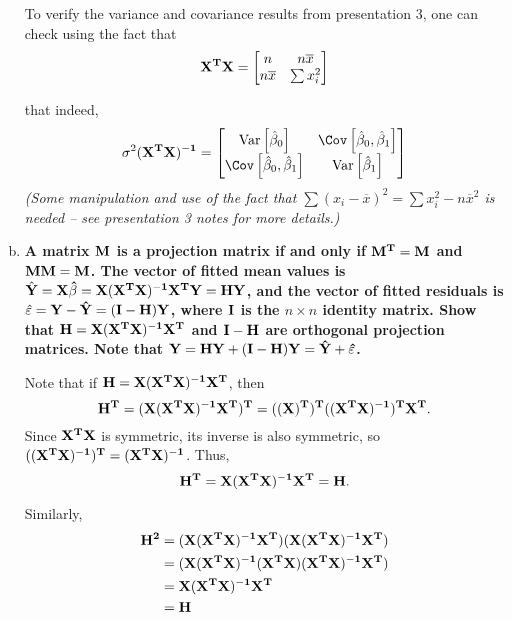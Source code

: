 \begin{enumerate}[a)]
To verify the variance and covariance results from presentation $3$, one can check using the fact that
\[
    \bf{X}^T \bf{X} = \begin{bmatrix}
        n & n \overline{x}   \\
        n \overline{x}  & \sum x_i^2
    \end{bmatrix}
\]

that indeed, 
\[
    \sigma^2 (\bf{X}^T \bf{X})^{-1} = \begin{bmatrix}
        \mathrm{Var} \left[\hat{\beta}_0 \right]  & \Cov \left[\hat{\beta}_0, \hat{\beta}_1 \right]   \\
        \Cov \left[\hat{\beta}_0, \hat{\beta}_1 \right] &  \mathrm{Var} \left[\hat{\beta}_1 \right] \\
    \end{bmatrix}
\]
\textit{(Some manipulation and use of the fact that $\sum (x_i - \overline{x} )^2 = \sum x_i^2 - n \overline{x}^2$ is needed -- see presentation 3 notes for more details.)}

\item \textbf{A matrix $\bf{M}$ is a projection matrix if and only if $\bf{M}^T = \bf{M}$ and $\bf{MM} = \bf{M}$. 
The vector of fitted mean values is $\hat{\bf{Y}} = \bf{X}\hat{\bf{\beta}} = \bf{X}(\bf{X}^T \bf{X})^{-1} \bf{X}^T \bf{Y} = \bf{HY}$, 
and the vector of fitted residuals is $\hat{\bf{\varepsilon}} = \bf{Y} - \hat{\bf{Y}} = (\bf{I} - \bf{H})\bf{Y}$, where $\bf{I}$ is the $n \times n$ identity matrix. 
Show that $\bf{H} = \bf{X}(\bf{X}^T \bf{X})^{-1} \bf{X}^T$ and $\bf{I} - \bf{H}$ are orthogonal projection matrices. 
Note that $\bf{Y} = \bf{HY} + (\bf{I} - \bf{H})\bf{Y} = \hat{\bf{Y}} + \hat{\bf{\varepsilon}}$.
}

Note that if $\bf{H} = \bf{X}(\bf{X}^T \bf{X})^{-1} \bf{X}^T$, then 
\[
    \bf{H}^T = (\bf{X}(\bf{X}^T \bf{X})^{-1} \bf{X}^T)^T = ((\bf{X})^T)^T ((\bf{X}^T \bf{X})^{-1})^T \bf{X}^T.
\]
Since $\bf{X}^T\bf{X}$ is symmetric, its inverse is also symmetric, so $((\bf{X}^T \bf{X})^{-1})^T = (\bf{X}^T \bf{X})^{-1}$. Thus,
\[
    \bf{H}^T = \bf{X} (\bf{X}^T \bf{X})^{-1} \bf{X}^T = \bf{H}.
\]

Similarly, 
\begin{align*}
    \bf{H}^2 &= (\bf{X}(\bf{X}^T \bf{X})^{-1} \bf{X}^T)(\bf{X}(\bf{X}^T \bf{X})^{-1} \bf{X}^T) \\
    &= (\bf{X}(\bf{X}^T \bf{X})^{-1} (\bf{X}^T\bf{X}) (\bf{X}^T \bf{X})^{-1} \bf{X}^T) \\
    &= \bf{X}(\bf{X}^T \bf{X})^{-1} \bf{X}^T \\
    &= \bf{H}
\end{align*}


\end{enumerate}
